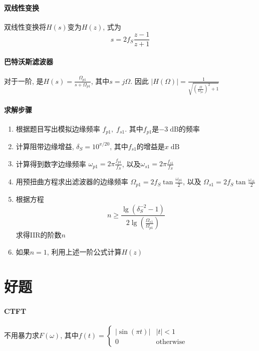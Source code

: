 \documentclass{ctexart}
\begin{document}
\paragraph{双线性变换} 双线性变换将$H(s)$变为$H(z)$, 式为\[
        s = 2 f_S \frac{z-1}{z+1}\]
\paragraph{巴特沃斯滤波器}
    对于一阶, 是$H(s) = \frac{\Omega_{p1}}{s + \Omega_{p1}}$, 其中$s = j \Omega$.
    因此 $|H(\Omega)| = \frac{1}{\sqrt{\left(\frac{\Omega}{\Omega_{p1}}\right)^2 + 1}}$
\paragraph{求解步骤}
    \begin{enumerate}
        \item 根据题目写出模拟边缘频率 $f_{p1},\;f_{s1}$.
            其中$f_{p1}$是$-3 \;\textrm{dB}$的频率
        \item 计算阻带边缘增益, $\delta_S = 10^{x/20}$,
            其中$f_{s1}$的增益是$x \;\textrm{dB}$
        \item 计算得到数字边缘频率 $\omega_{p1} = 2\pi \frac{f_{p1}}{f_S}$, 
            以及$\omega_{s1} = 2\pi \frac{f_{s1}}{f_S}$
        \item 用预扭曲方程求出滤波器的边缘频率
            $\Omega_{p1} = 2 f_S \tan \frac{\omega_{p1}}{2}$, 
            以及
            $\Omega_{s1} = 2 f_S \tan \frac{\omega_{s1}}{2}$
        \item 根据方程\[
                n \ge \frac
                    { \lg\left(\delta_S^{-2} - 1\right)  }
                    { 2 \lg\left( \frac{\Omega_{s1}}{\Omega_{p1}}\right)} \]
            求得IIR的阶数$n$
        \item 如果$n = 1$, 利用上述一阶公式计算$H(z)$
    \end{enumerate}

\section{好题}
\paragraph{CTFT} 不用暴力求$F(\omega)$, 其中$f(t) = \begin{cases} |\sin(\pi t)| & |t| < 1\\ 0 & \text{otherwise} \end{cases}$
\end{document}
